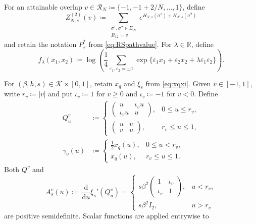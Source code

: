 \documentclass[11pt]{article}
\numberwithin{equation}{section}
\newcommand{\R}{\mathbb{R}}
\newcommand{\1}{\mathbf 1}
\newcommand{\cK}{\mathcal K}
\newcommand{\dd}{\,\mathrm d}
\begin{document}
For an attainable overlap $v\in\mathcal R_N
\coloneqq\{-1,-1+2/N,\ldots,1\}$, define
\begin{equation}
 Z^{(2)}_{N,s}(v)
 \coloneqq
 \sum_{\substack{\sigma^1,\sigma^2\in\Sigma_N\\R_{12}=v}}
 e^{H_{N,s}(\sigma^1)+H_{N,s}(\sigma^2)}
 \label{eq:constrainedZ}
\end{equation}
and retain the notation $P_s^*$ from \eqref{eq:RSpathvalue}.  For
$\lambda\in\mathbb R$, define
\begin{equation}
 f_\lambda(x_1,x_2)
 \coloneqq\log\left(\frac14\sum_{\varepsilon_1,\varepsilon_2=\pm1}
 \exp\{\varepsilon_1x_1+\varepsilon_2x_2
       +\lambda\varepsilon_1\varepsilon_2\}\right).
 \label{eq:GTterminal}
\end{equation}

For $(\beta,h,s)\in\cK\times[0,1]$, retain $x_q$ and $\xi_s$ from
\eqref{eq:xqxi}.  Given $v\in[-1,1]$, write
$r_v\coloneqq|v|$ and put $\iota_v\coloneqq1$ for $v\ge0$ and
$\iota_v\coloneqq-1$ for $v<0$.  Define
\begin{align}
 Q^v_u
 &\coloneqq
 \begin{cases}
  \begin{pmatrix}u&\iota_vu\\ \iota_vu&u\end{pmatrix},
       &0\le u\le r_v,\\[2mm]
  \begin{pmatrix}u&v\\v&u\end{pmatrix},
       &r_v\le u\le1,
 \end{cases}
 \label{eq:GTpath}\\
 \gamma_v(u)
 &\coloneqq
 \begin{cases}
  \frac12x_q(u),&0\le u<r_v,\\
  x_q(u),&r_v\le u\le1.
 \end{cases}
 \label{eq:halfparameter}
\end{align}
Both $Q^v$ and
\begin{equation}
 A^v_s(u)\coloneqq\frac{\dd}{\dd u}\xi_s'(Q^v_u)
 =
 \begin{cases}
 s\beta^2\begin{pmatrix}1&\iota_v\\\iota_v&1\end{pmatrix},&u<r_v,\\[2mm]
 s\beta^2I_2,&u>r_v
 \end{cases}
 \label{eq:GTspeed}
\end{equation}
are positive semidefinite.  Scalar functions are applied entrywise to
\end{document}
